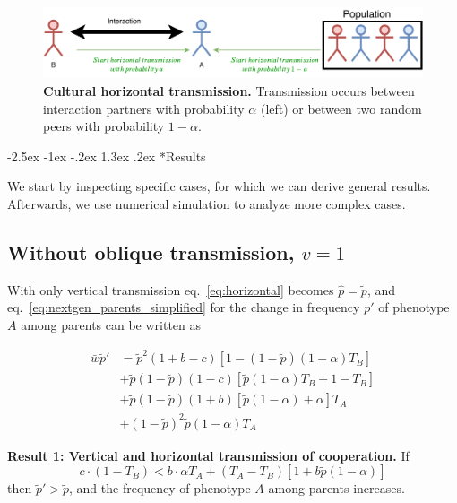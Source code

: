 \documentclass[12pt]{extarticle}
\makeatletter
\renewcommand\section{\@startsection {section}{1}{\z@}%
     {-2.5ex \@plus -1ex \@minus -.2ex}%
     {1.3ex \@plus.2ex}%
    {\Large\bfseries}}
\makeatother
\begin{document}
\begin{figure}[b]
  \centering
  \includegraphics[scale=1]{figure1.pdf}
  \caption{\textbf{Cultural horizontal transmission.} Transmission occurs between interaction partners with probability $\alpha$ (left) or between two random peers with probability $1-\alpha$.}
  \label{fig:horizontal}
\end{figure}

\section*{Results}

We start by inspecting specific cases, for which we can derive general results. 
Afterwards, we use numerical simulation to analyze more complex cases.

\subsection*{Without oblique transmission, $v=1$}

With only vertical transmission eq.~\ref{eq:horizontal} becomes
$\hat{p} =  \tilde{p}$,
and eq.~\ref{eq:nextgen_parents_simplified} for the change in frequency $p'$ of phenotype $A$ among parents can be written as

\begin{equation} 
\begin{split}\label{eq:nextgen_parents_vertical_only}
\bar{w} \tilde{p}' 
& = \tilde{p}^2 (1+b-c) [1 - (1-\tilde{p}) (1-\alpha) T_B] \\
& + \tilde{p}(1-\tilde{p}) (1-c) [\tilde{p} (1-\alpha) T_B + 1 - T_B] \\
& + \tilde{p}(1-\tilde{p}) (1+b) [\tilde{p} (1-\alpha) + \alpha] T_A \\
& + (1-\tilde{p})^2 \tilde{p} (1-\alpha) T_A
\end{split}
\end{equation}

\textbf{Result 1: Vertical and horizontal transmission of cooperation.}
If 
\begin{equation} \label{eq:unequal_transmission}
c \cdot (1-T_B) < b \cdot  \alpha T_A  + (T_A - T_B) [1 + b\tilde{p}(1-\alpha)]
\end{equation}
then $\tilde{p}' > \tilde{p}$, and the frequency of phenotype $A$ among parents increases. 
\end{document}
